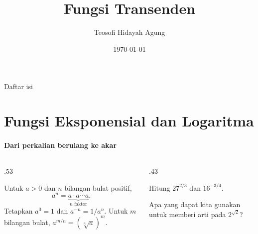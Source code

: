 \documentclass{../../kalkulus-ppt}
\author[Tetew]{Teosofi Hidayah Agung}
\date{\today}
\title[Kalkulus 2 - Bab 1]{Fungsi Transenden}
\institute[Matematika ITS]{Departemen Matematika\\ Institut Teknologi Sepuluh Nopember}
\begin{document}
\begin{frame}
    \titlepage
\end{frame}

\begin{frame}{Daftar isi}
    \tableofcontents
\end{frame}

\section{Fungsi Eksponensial dan Logaritma}

\begin{frame}{\insertsection}
    \framesubtitle{Dari perkalian berulang ke akar}
    \begin{columns}[c,onlytextwidth]
        \begin{column}{.53\textwidth}
            \begin{definisi}
                Untuk $a>0$ dan $n$ bilangan bulat positif,
                \[
                    a^n=\underbrace{a\cdot a\cdots a}_{n\text{ faktor}}.
                \]
                Tetapkan $a^0=1$ dan $a^{-n}=1/a^n$. Untuk $m$ bilangan bulat,
                $a^{m/n}=(\sqrt[n]{a})^m$.
            \end{definisi}
        \end{column}
        \begin{column}{.43\textwidth}
            \begin{contoh}
                Hitung $27^{2/3}$ dan $16^{-3/4}$.
            \end{contoh}
            Apa yang dapat kita gunakan untuk memberi arti pada $2^{\sqrt 2}$?
        \end{column}
    \end{columns}
\end{frame}
\end{document}
